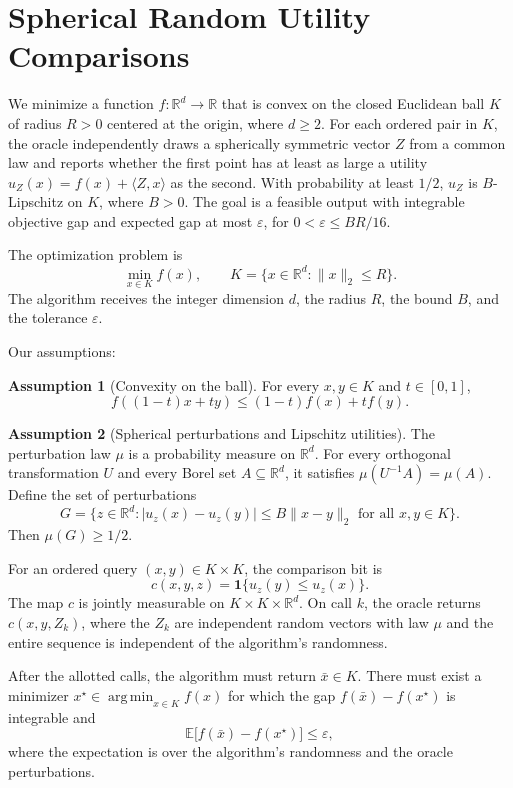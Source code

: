 \documentclass[10pt]{article}
\theoremstyle{definition}
\newtheorem{assumption}{Assumption}
\begin{document}
\section*{Spherical Random Utility Comparisons}
We minimize a function $f:\mathbb{R}^d\to\mathbb{R}$ that is convex on the closed Euclidean ball $K$ of radius $R>0$ centered at the origin, where $d\geq 2$. For each ordered pair in $K$, the oracle independently draws a spherically symmetric vector $Z$ from a common law and reports whether the first point has at least as large a utility $u_Z(x)=f(x)+\langle Z,x\rangle$ as the second. With probability at least $1/2$, $u_Z$ is $B$-Lipschitz on $K$, where $B>0$. The goal is a feasible output with integrable objective gap and expected gap at most $\varepsilon$, for $0<\varepsilon\leq BR/16$.

The optimization problem is
\[
\min_{x\in K} f(x),
\qquad K=\{x\in\mathbb{R}^d:\|x\|_2\leq R\}.
\]
The algorithm receives the integer dimension $d$, the radius $R$, the bound $B$, and the tolerance $\varepsilon$.

Our assumptions:
\begin{assumption}[Convexity on the ball]
For every $x,y\in K$ and $t\in[0,1]$,
\[
f((1-t)x+ty)\leq (1-t)f(x)+t f(y).
\]
\end{assumption}

\begin{assumption}[Spherical perturbations and Lipschitz utilities]
The perturbation law $\mu$ is a probability measure on $\mathbb{R}^d$. For every orthogonal transformation $U$ and every Borel set $A\subseteq\mathbb{R}^d$, it satisfies $\mu(U^{-1}A)=\mu(A)$. Define the set of perturbations
\[
G=\bigl\{z\in\mathbb{R}^d: |u_z(x)-u_z(y)|\leq B\|x-y\|_2
\text{ for all }x,y\in K\bigr\}.
\]
Then $\mu(G)\geq 1/2$.
\end{assumption}

For an ordered query $(x,y)\in K\times K$, the comparison bit is
\[
c(x,y,z)=\mathbf{1}\{u_z(y)\leq u_z(x)\}.
\]
The map $c$ is jointly measurable on $K\times K\times\mathbb{R}^d$. On call $k$, the oracle returns $c(x,y,Z_k)$, where the $Z_k$ are independent random vectors with law $\mu$ and the entire sequence is independent of the algorithm's randomness.

After the allotted calls, the algorithm must return $\bar{x}\in K$. There must exist a minimizer $x^\star\in\operatorname*{arg\,min}_{x\in K} f(x)$ for which the gap $f(\bar{x})-f(x^\star)$ is integrable and
\[
\mathbb{E}\bigl[f(\bar{x})-f(x^\star)\bigr]\leq\varepsilon,
\]
where the expectation is over the algorithm's randomness and the oracle perturbations.
\end{document}
